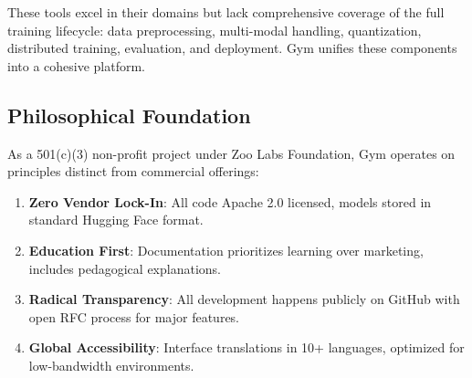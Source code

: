These tools excel in their domains but lack comprehensive coverage of the full training lifecycle: data preprocessing, multi-modal handling, quantization, distributed training, evaluation, and deployment. Gym unifies these components into a cohesive platform.

\subsection{Philosophical Foundation}

As a 501(c)(3) non-profit project under Zoo Labs Foundation, Gym operates on principles distinct from commercial offerings:

\begin{enumerate}
\item \textbf{Zero Vendor Lock-In}: All code Apache 2.0 licensed, models stored in standard Hugging Face format.
\item \textbf{Education First}: Documentation prioritizes learning over marketing, includes pedagogical explanations.
\item \textbf{Radical Transparency}: All development happens publicly on GitHub with open RFC process for major features.
\item \textbf{Global Accessibility}: Interface translations in 10+ languages, optimized for low-bandwidth environments.
\end{enumerate}

